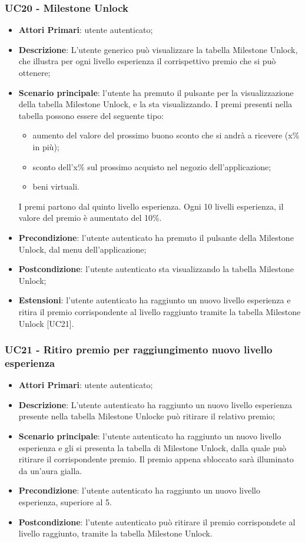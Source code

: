 

\subsubsection{UC20 - Milestone Unlock}
\begin{itemize}
	\item \textbf{Attori Primari}: utente autenticato;
	\item \textbf{Descrizione}: L'utente generico può visualizzare la tabella Milestone Unlock\glo, che illustra per ogni livello esperienza il corrispettivo premio che si può ottenere;	
	\item \textbf{Scenario principale}: l'utente ha premuto il pulsante per la visualizzazione della tabella Milestone Unlock, e la sta visualizzando.
	I premi presenti nella tabella possono essere del seguente tipo:
	\begin{itemize}
		\item aumento del valore del prossimo buono sconto che si andrà a ricevere (x\% in più);
		\item sconto dell'x\% sul prossimo acquisto nel negozio dell'applicazione;
		\item beni virtuali.
	\end{itemize}
	I premi partono dal quinto livello esperienza.
	Ogni 10 livelli esperienza, il valore del premio è aumentato del 10\%.
	\item \textbf{Precondizione}: l'utente autenticato ha premuto il pulsante della Milestone Unlock, dal menu dell'applicazione;
	\item \textbf{Postcondizione}: l'utente autenticato sta visualizzando la tabella Milestone Unlock;
	\item \textbf{Estensioni}:
			l'utente autenticato ha raggiunto un nuovo livello esperienza e ritira il premio corrispondente al livello raggiunto tramite la tabella Milestone Unlock [UC21].
\end{itemize}
\subsubsection{UC21 - Ritiro premio per raggiungimento nuovo livello esperienza}
\begin{itemize}
	\item \textbf{Attori Primari}: utente autenticato;
	\item \textbf{Descrizione}: L'utente autenticato ha raggiunto un nuovo livello esperienza presente nella tabella Milestone Unlock\glosp e può ritirare il relativo premio;	
	\item \textbf{Scenario principale}: l'utente autenticato ha raggiunto un nuovo livello esperienza e gli si presenta la tabella di Milestone Unlock, dalla quale può ritirare il corrispondente premio. Il premio appena sbloccato sarà illuminato da un'aura gialla.
	\item \textbf{Precondizione}: l'utente autenticato ha raggiunto un nuovo livello esperienza, superiore al 5.
	\item \textbf{Postcondizione}: l'utente autenticato può ritirare il premio corrispondete al livello raggiunto, tramite la tabella Milestone Unlock.
\end{itemize}

